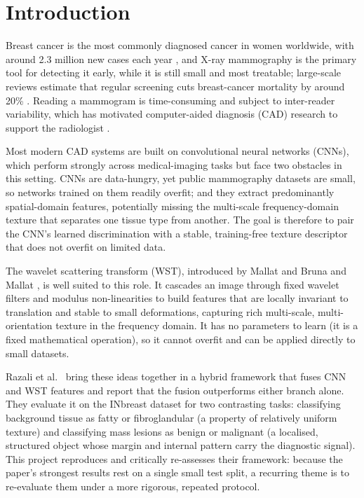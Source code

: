 
\chapter{Introduction}

Breast cancer is the most commonly diagnosed cancer in women worldwide, with around 2.3 million new cases each year \cite{sung2021global}, and X-ray mammography is the primary tool for detecting it early, while it is still small and most treatable; large-scale reviews estimate that regular screening cuts breast-cancer mortality by around 20\% \cite{marmot2012benefits}. Reading a mammogram is time-consuming and subject to inter-reader variability, which has motivated computer-aided diagnosis (CAD) research to support the radiologist \cite{burt2018deep}.

Most modern CAD systems are built on convolutional neural networks (CNNs), which perform strongly across medical-imaging tasks \cite{burt2018deep} but face two obstacles in this setting. CNNs are data-hungry, yet public mammography datasets are small, so networks trained on them readily overfit; and they extract predominantly spatial-domain features, potentially missing the multi-scale frequency-domain texture that separates one tissue type from another. The goal is therefore to pair the CNN's learned discrimination with a stable, training-free texture descriptor that does not overfit on limited data.

The wavelet scattering transform (WST), introduced by Mallat \cite{mallat2012invariant} and Bruna and Mallat \cite{bruna2013invariant}, is well suited to this role. It cascades an image through fixed wavelet filters and modulus non-linearities to build features that are locally invariant to translation and stable to small deformations, capturing rich multi-scale, multi-orientation texture in the frequency domain. It has no parameters to learn (it is a fixed mathematical operation), so it cannot overfit and can be applied directly to small datasets.

Razali et al.\ \cite{razali2023cnn} bring these ideas together in a hybrid framework that fuses CNN and WST features and report that the fusion outperforms either branch alone. They evaluate it on the INbreast dataset \cite{moreira2012inbreast} for two contrasting tasks: classifying background tissue as fatty or fibroglandular (a property of relatively uniform texture) and classifying mass lesions as benign or malignant (a localised, structured object whose margin and internal pattern carry the diagnostic signal). This project reproduces and critically re-assesses their framework: because the paper's strongest results rest on a single small test split, a recurring theme is to re-evaluate them under a more rigorous, repeated protocol.

